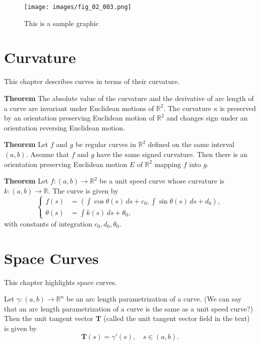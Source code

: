 \documentclass{book}
\begin{document}
		\begin{figure}
			\centering
			\texttt{[image: images/fig\_02\_003.png]}
			\caption{This is a sample graphic}
			\label{fig_2_3}
		\end{figure}				
		
	\chapter{Curvature}
		This chapter describes curves in terms of their curvature.
	
		\textbf{Theorem} The absolute value of the curvature and the derivative of arc length of a curve are invariant under Euclidean motions of $\mathbb{R}^2$. The curvature $\kappa$ is preserved by an orientation preserving Euclidean motion of $\mathbb{R}^2$ and changes sign under an orientation reversing Euclidean motion.
		
		\textbf{Theorem} Let $f$ and $g$ be regular curves in $\mathbb{R}^2$ defined on the same interval $(a,b)$. Assume that $f$ and $g$ have the same signed curvature. Then there is an orientation preserving Euclidean motion $E$ of $\mathbb{R}^2$ mapping $f$ into $g$.
		
		\textbf{Theorem} Let $f:(a,b)\rightarrow\mathbb{R}^2$ be a unit speed curve whose curvature is $k:(a,b)\rightarrow\mathbb{R}$. The curve is given by
		\begin{equation*}
			\left\{
			\begin{aligned}
				f(s)&=\left(\int\cos{\theta(s)\,ds}+c_0,\int\sin{\theta(s)\,ds+d_0}\right),\\
				\theta(s)&=\int{k(s)\,ds}+\theta_0,
			\end{aligned}
			\right.
		\end{equation*}
		with constants of integration $c_0, d_0, \theta_0$.
		
	\chapter{Space Curves}
		This chapter highlights space curves.
		
		Let $\gamma:(a,b)\rightarrow\mathbb{R}^n$ be an arc length parametrization of a curve. (We can say that an arc length parametrization of a curve is the same as a unit speed curve?) Then the unit tangent vector $\mathbf{T}$ (called the unit tangent vector field in the text) is given by
		\begin{equation}
			\mathbf{T}(s)=\gamma'(s),\quad s\in(a,b)\mathrm{.}
		\end{equation}
		
\end{document}
